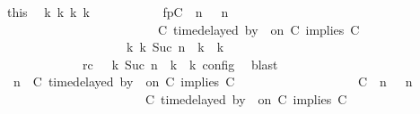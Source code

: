 \begin{isabellebody}
\ this\ \isamarkupfalse%
\ {\isasymGamma}\isactrlsub k\ {\isasymPsi}\isactrlsub k\ {\isasymPhi}\isactrlsub k\ k\isanewline
\ \ \ \ \ \ \ \ \ \ \ fp{\isacharcolon}{\isacartoucheopen}{\isacharparenleft}{\isacharparenleft}{\isacharparenleft}C\ {\isasymnot}{\isasymUp}\ n{\isacharparenright}\ {\isacharhash}\ {\isasymGamma}{\isacharparenright}{\isacharcomma}\ n\isanewline
\ \ \ \ \ \ \ \ \ \ \ \ \ \ \ \ \ \ \ \ \ \ {\isasymturnstile}\ {\isasymPsi}\ {\isasymtriangleright}\ {\isacharparenleft}{\isacharparenleft}C\ time{\isacharminus}delayed\ by\ {\isasymdelta}{\isasymtau}\ on\ C\ implies\ C\ {\isacharhash}\ {\isasymPhi}{\isacharparenright}{\isacharparenright}\isanewline
\ \ \ \ \ \ \ \ \ \ \ \ \ \ \ \ \ \ \ \ {\isasymhookrightarrow}\isactrlbsup k\isactrlesup \ {\isacharparenleft}{\isasymGamma}\isactrlsub k{\isacharcomma}\ Suc\ n\ {\isasymturnstile}\ {\isasymPsi}\isactrlsub k\ {\isasymtriangleright}\ {\isasymPhi}\isactrlsub k{\isacharparenright}{\isacartoucheclose}\isanewline
\ \ \ \ \ \ \ \ \ \ \ \ \ rc{\isacharcolon}{\isacartoucheopen}{\isasymrho}\ {\isasymin}\ {\isasymlbrakk}\ {\isasymGamma}\isactrlsub k{\isacharcomma}\ Suc\ n\ {\isasymturnstile}\ {\isasymPsi}\isactrlsub k\ {\isasymtriangleright}\ {\isasymPhi}\isactrlsub k\ {\isasymrbrakk}\isactrlsub c\isactrlsub o\isactrlsub n\isactrlsub f\isactrlsub i\isactrlsub g{\isacartoucheclose}\ \isamarkupfalse%
\ blast\isanewline
\ \ \ \ \ \ \ \ \isamarkupfalse%
\ {\isacartoucheopen}{\isacharparenleft}{\isasymGamma}{\isacharcomma}\ n\ {\isasymturnstile}\ {\isacharparenleft}{\isacharparenleft}C\ time{\isacharminus}delayed\ by\ {\isasymdelta}{\isasymtau}\ on\ C\ implies\ C\ {\isacharhash}\ {\isasymPsi}{\isacharparenright}\ {\isasymtriangleright}\ {\isasymPhi}{\isacharparenright}\isanewline
\ \ \ \ \ \ \ \ \ \ \ \ \ \ {\isasymhookrightarrow}\ {\isacharparenleft}{\isacharparenleft}{\isacharparenleft}C\ {\isasymnot}{\isasymUp}\ n{\isacharparenright}\ {\isacharhash}\ {\isasymGamma}{\isacharparenright}{\isacharcomma}\ n\isanewline
\ \ \ \ \ \ \ \ \ \ \ \ \ \ \ \ \ \ \ \ {\isasymturnstile}\ {\isasymPsi}\ {\isasymtriangleright}\ {\isacharparenleft}{\isacharparenleft}C\ time{\isacharminus}delayed\ by\ {\isasymdelta}{\isasymtau}\ on\ C\ implies\ C\ {\isacharhash}\ {\isasymPhi}{\isacharparenright}{\isacharparenright}{\isacartoucheclose}\isanewline

\end{isabellebody}
